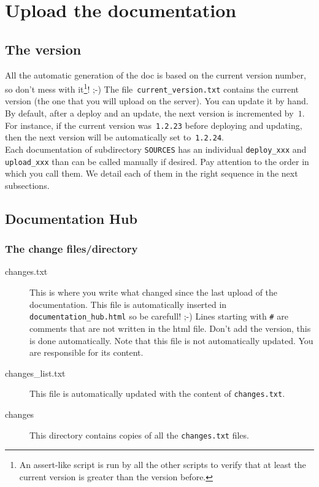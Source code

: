 \documentclass[a4paper,10pt]{article}
\begin{document}
\section{Upload the documentation}
\label{upload_documentation}

\subsection{The version}
All the automatic generation of the doc is based on the current version number, so don't mess with it\footnote{An assert-like script is run by all the other scripts to verify that at least the current version is
greater than the version before.}! ;-) 
The file~\verb+current_version.txt+ contains the current version (the one that you will upload on the server). You can update it by hand. By default, after a deploy and an update, the next version is incremented by~$1$. For instance, if the current version was~\verb+1.2.23+ before deploying and updating, then the next version will be automatically set to~\verb+1.2.24+.\\

Each documentation of subdirectory \verb+SOURCES+  has an individual \verb+deploy_xxx+ and \verb+upload_xxx+ than can be called manually if desired. Pay attention to the order in which you call them.
 We detail each of them in the right sequence in the next subsections.
\subsection{Documentation Hub}

\subsubsection{The change files/directory}

\begin{description}
 \item[changes.txt] This is where you write what changed since the last upload of the documentation. This file is automatically inserted in \verb+documentation_hub.html+ so be carefull! ;-) Lines starting with \verb+#+ are comments that are not written in the html file. Don't add the version, this is done automatically. Note that this file is not automatically updated. You are responsible for its content.
 \item[changes\_list.txt] This file is automatically updated with the content of \verb+changes.txt+.
 \item[changes] This directory contains copies of all the \verb+changes.txt+ files.
 \end{description}
\end{document}
